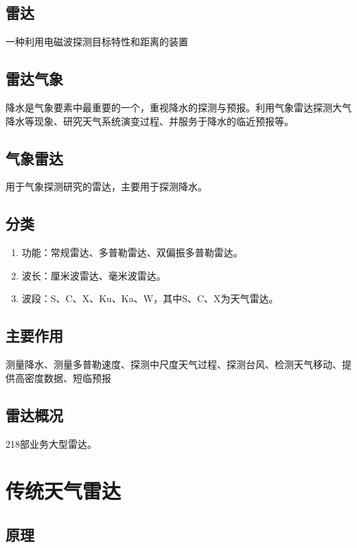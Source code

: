 \documentclass[UTF8,11pt]{ctexbook}
\begin{document}
\subsection{雷达}

一种利用电磁波探测目标特性和距离的装置

\subsection{雷达气象}

降水是气象要素中最重要的一个，重视降水的探测与预报。利用气象雷达探测大气降水等现象、研究天气系统演变过程、并服务于降水的临近预报等。

\subsection{气象雷达}

用于气象探测研究的雷达，主要用于探测降水。

\subsection{分类}
\begin{enumerate}
    \item 功能：常规雷达、多普勒雷达、双偏振多普勒雷达。
    \item 波长：厘米波雷达、毫米波雷达。
    \item 波段：S、C、X、Ku、Ka、W，其中S、C、X为天气雷达。
\end{enumerate}

\subsection{主要作用}

测量降水、测量多普勒速度、探测中尺度天气过程、探测台风、检测天气移动、提供高密度数据、短临预报

\subsection{雷达概况}

218部业务大型雷达。

\section{传统天气雷达}

\subsection{原理}
\end{document}
